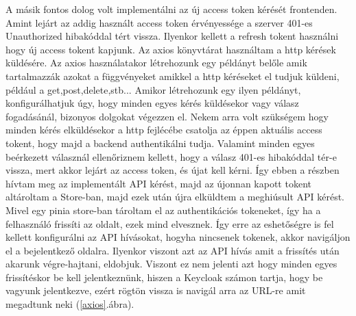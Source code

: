 \documentclass[a4paper,twoside]{article}
\begin{document}
A másik fontos dolog volt implementálni az új access token kérését frontenden. Amint lejárt az addig használt access token érvényessége a szerver 401-es Unauthorized 
hibakóddal tért vissza. Ilyenkor kellett a refresh tokent használni hogy új access tokent kapjunk. Az axios könyvtárat használtam a http kérések küldésére. Az axios 
használatakor létrehozunk egy példányt belőle amik tartalmazzák azokat a függvényeket amikkel a http kéréseket el tudjuk küldeni, például a get,post,delete,stb... Amikor létrehozunk egy ilyen példányt, konfigurálhatjuk úgy, hogy minden egyes kérés küldésekor vagy válasz fogadásánál, bizonyos dolgokat végezzen el. Nekem arra volt szükségem hogy minden kérés elküldésekor a http fejlécébe csatolja az éppen aktuális access tokent, hogy majd a backend authentikálni tudja. Valamint minden egyes beérkezett válasznál ellenőriznem kellett, hogy a válasz 401-es hibakóddal tér-e vissza, mert akkor lejárt az access token, és újat kell kérni. Így ebben a részben hívtam meg az implementált API kérést, majd az újonnan kapott tokent altároltam a Store-ban, majd ezek után újra elküldtem a meghiúsult API kérést. Mivel egy 
pinia store-ban tároltam el az authentikációs tokeneket, így ha a felhasználó frissíti az oldalt, ezek mind elvesznek. Így erre az eshetőségre is fel kellett konfigurálni az API hívásokat, hogyha nincsenek tokenek, akkor navigáljon el a bejelentkező oldalra. Ilyenkor viszont azt az API hívás amit a frissítés után akarunk végre-hajtani, eldobjuk. Viszont ez nem jelenti azt hogy minden egyes frissítéskor be kell jelentkeznünk, hiszen a Keycloak számon tartja, hogy be vagyunk jelentkezve, ezért rögtön vissza is navigál arra az URL-re amit megadtunk neki (\ref{axios}.ábra).
\end{document}
